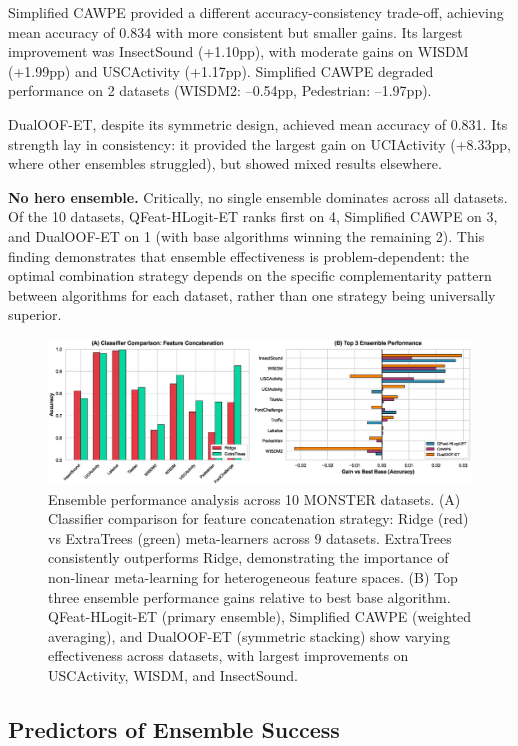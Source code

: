 \documentclass[pdflatex,sn-basic]{sn-jnl}           %
\theoremstyle{thmstyleone}%
\theoremstyle{thmstyletwo}%
\theoremstyle{thmstylethree}%
\begin{document}
Simplified CAWPE provided a different accuracy-consistency trade-off, achieving mean accuracy of 0.834 with more consistent but smaller gains. Its largest improvement was InsectSound (+1.10pp), with moderate gains on WISDM (+1.99pp) and USCActivity (+1.17pp). Simplified CAWPE degraded performance on 2 datasets (WISDM2: --0.54pp, Pedestrian: --1.97pp).

DualOOF-ET, despite its symmetric design, achieved mean accuracy of 0.831. Its strength lay in consistency: it provided the largest gain on UCIActivity (+8.33pp, where other ensembles struggled), but showed mixed results elsewhere.

\textbf{No hero ensemble.} Critically, no single ensemble dominates across all datasets. Of the 10 datasets, QFeat-HLogit-ET ranks first on 4, Simplified CAWPE on 3, and DualOOF-ET on 1 (with base algorithms winning the remaining 2). This finding demonstrates that ensemble effectiveness is problem-dependent: the optimal combination strategy depends on the specific complementarity pattern between algorithms for each dataset, rather than one strategy being universally superior.

\begin{figure}[t]
\centering
\includegraphics[width=\textwidth]{figure2_ensemble_performance}
\caption{Ensemble performance analysis across 10 MONSTER datasets. (A) Classifier comparison for feature concatenation strategy: Ridge (red) vs ExtraTrees (green) meta-learners across 9 datasets. ExtraTrees consistently outperforms Ridge, demonstrating the importance of non-linear meta-learning for heterogeneous feature spaces. (B) Top three ensemble performance gains relative to best base algorithm. QFeat-HLogit-ET (primary ensemble), Simplified CAWPE (weighted averaging), and DualOOF-ET (symmetric stacking) show varying effectiveness across datasets, with largest improvements on USCActivity, WISDM, and InsectSound.}\label{fig:ensemble}
\end{figure}

\subsection{Predictors of Ensemble Success}\label{subsec:predictors}
\end{document}
